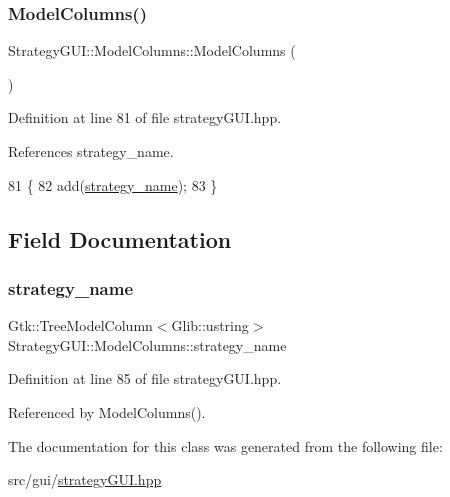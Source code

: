 \subsubsection{\texorpdfstring{Model\+Columns()}{ModelColumns()}}
{\footnotesize\ttfamily Strategy\+G\+U\+I\+::\+Model\+Columns\+::\+Model\+Columns (\begin{DoxyParamCaption}{ }\end{DoxyParamCaption})\hspace{0.3cm}{\ttfamily [inline]}}



Definition at line 81 of file strategy\+G\+U\+I.\+hpp.



References strategy\+\_\+name.


\begin{DoxyCode}
81                        \{
82             add(\hyperlink{class_strategy_g_u_i_1_1_model_columns_a4338572b76dd7ebb1bd59b7ac2aca591}{strategy\_name});
83         \}
\end{DoxyCode}


\subsection{Field Documentation}
\mbox{\label{class_strategy_g_u_i_1_1_model_columns_a4338572b76dd7ebb1bd59b7ac2aca591}} 
\subsubsection{\texorpdfstring{strategy\+\_\+name}{strategy\_name}}
{\footnotesize\ttfamily Gtk\+::\+Tree\+Model\+Column$<$Glib\+::ustring$>$ Strategy\+G\+U\+I\+::\+Model\+Columns\+::strategy\+\_\+name}



Definition at line 85 of file strategy\+G\+U\+I.\+hpp.



Referenced by Model\+Columns().



The documentation for this class was generated from the following file\+:\begin{DoxyCompactItemize}
\item 
src/gui/\hyperlink{strategy_g_u_i_8hpp}{strategy\+G\+U\+I.\+hpp}\end{DoxyCompactItemize}
